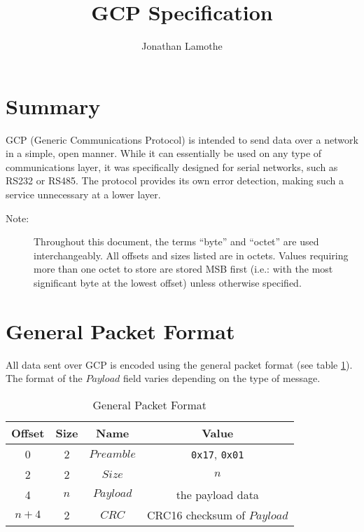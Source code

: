 \documentclass{article}
\title{GCP Specification}
\author{Jonathan Lamothe}
\begin{document}
\maketitle

\section{Summary}
GCP (Generic Communications Protocol) is intended to send data over a
network in a simple, open manner.  While it can essentially be used on
any type of communications layer, it was specifically designed for
serial networks, such as RS232 or RS485.  The protocol provides its
own error detection, making such a service unnecessary at a lower
layer.

\begin{description}
  \item[Note:]Throughout this document, the terms ``byte'' and
    ``octet'' are used interchangeably.  All offsets and sizes listed
    are in octets.  Values requiring more than one octet to store are
    stored MSB first (i.e.: with the most significant byte at the
    lowest offset) unless otherwise specified.
\end{description}

\section{General Packet Format}
All data sent over GCP is encoded using the general packet format (see
table \ref{tab:gen-pkt-fmt}).  The format of the $Payload$ field
varies depending on the type of message.

\begin{table}[hbp]
  \center
  \begin{tabular}{cccc}
    \textbf{Offset} & \textbf{Size} & \textbf{Name} & \textbf{Value}\\
    \hline
    0 & 2 & $Preamble$ & \texttt{0x17}, \texttt{0x01}\\
    2 & 2 & $Size$ & $n$\\
    4 & $n$ & $Payload$ & the payload data\\
    $n + 4$ & 2 & $CRC$ & CRC16 checksum of $Payload$\\
    \hline
  \end{tabular}
  \caption{General Packet Format\label{tab:gen-pkt-fmt}}
\end{table}
\end{document}
